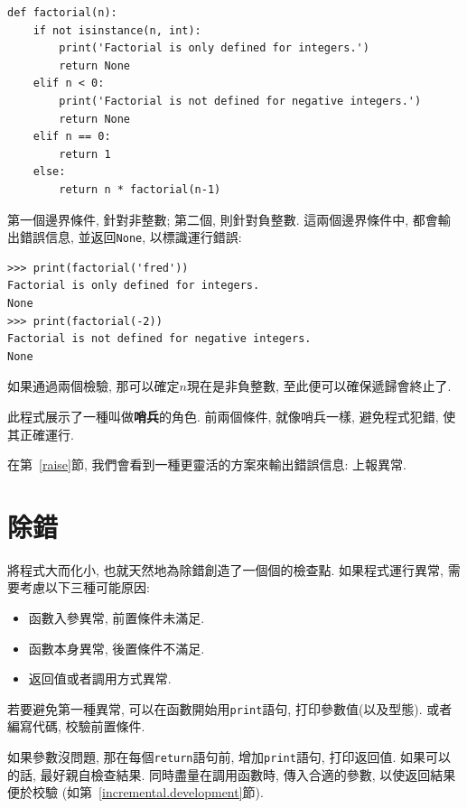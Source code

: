 \documentclass[10pt]{book}
\begin{document}
\begin{verbatim}
def factorial(n):
    if not isinstance(n, int):
        print('Factorial is only defined for integers.')
        return None
    elif n < 0:
        print('Factorial is not defined for negative integers.')
        return None
    elif n == 0:
        return 1
    else:
        return n * factorial(n-1)
\end{verbatim}
%
第一個邊界條件, 針對非整數;
第二個, 則針對負整數. 
這兩個邊界條件中, 都會輸出錯誤信息, 並返回{\tt None}, 
以標識運行錯誤:

\begin{verbatim}
>>> print(factorial('fred'))
Factorial is only defined for integers.
None
>>> print(factorial(-2))
Factorial is not defined for negative integers.
None
\end{verbatim}
% 
如果通過兩個檢驗, 那可以確定$n$現在是非負整數, 
至此便可以確保遞歸會終止了. 

此程式展示了一種叫做{\bf 哨兵}的角色. 
前兩個條件, 就像哨兵一樣, 避免程式犯錯, 使其正確運行. 

在第~\ref{raise}節, 我們會看到一種更靈活的方案來輸出錯誤信息: 上報異常. 


\section{除錯}
\label{factdebug}
將程式大而化小, 也就天然地為除錯創造了一個個的檢查點. 
如果程式運行異常, 需要考慮以下三種可能原因:

\begin{itemize}

\item 函數入參異常, 前置條件未滿足. 

\item 函數本身異常, 後置條件不滿足. 

\item 返回值或者調用方式異常. 

\end{itemize}

若要避免第一種異常, 可以在函數開始用{\tt  print}語句, 打印參數值(以及型態). 
或者編寫代碼, 校驗前置條件. 

如果參數沒問題, 那在每個{\tt return}語句前, 增加{\tt print}語句, 打印返回值. 
如果可以的話, 最好親自檢查結果. 同時盡量在調用函數時, 傳入合適的參數, 
以使返回結果便於校驗
(如第~\ref{incremental.development}節). 
\end{document}
